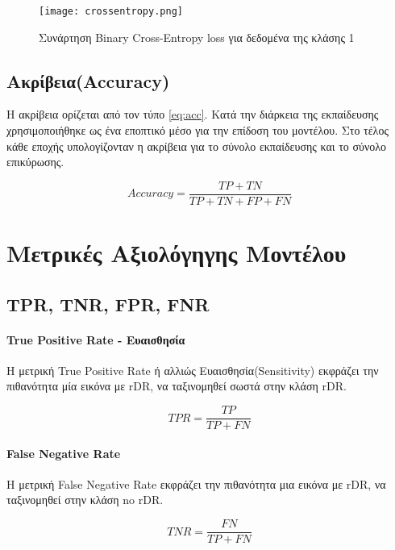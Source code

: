 \begin{figure}[!h]
    \centering
      \texttt{[image: crossentropy.png]} \caption{Συνάρτηση Binary Cross-Entropy loss για δεδομένα της κλάσης 1}
\label{figure:cross}    
\end{figure}
  
  
\subsection{Ακρίβεια(Accuracy)}
\label{subsec:6.1.2}
Η ακρίβεια ορίζεται από τον τύπο \ref{eq:acc}. Κατά την διάρκεια της εκπαίδευσης χρησιμοποιήθηκε ως ένα εποπτικό μέσο για την επίδοση του μοντέλου. Στο τέλος κάθε εποχής υπολογίζονταν η ακρίβεια για το σύνολο εκπαίδευσης και το σύνολο επικύρωσης.

\begin{equation} \label{eq:acc}
Accuracy = \frac{TP+TN}{TP+TN+FP+FN}
\end{equation}



\section{Μετρικές Αξιολόγηγης Μοντέλου}
\label{sec:6.2}



\subsection{TPR, TNR, FPR, FNR}
\label{subsec:6.2.1}

\paragraph{True Positive Rate - Ευαισθησία}
Η μετρική  True Positive Rate ή αλλιώς Ευαισθησία(Sensitivity) εκφράζει την πιθανότητα μία εικόνα με rDR, να ταξινομηθεί σωστά στην κλάση rDR.

\begin{equation} \label{eq:6.9}
TPR = \frac{TP}{TP + FN}
\end{equation}

\paragraph{False Negative Rate}
Η μετρική  False Negative Rate εκφράζει την πιθανότητα μια εικόνα με rDR, να ταξινομηθεί στην κλάση no rDR. 

\begin{equation} \label{eq:6.12}
TNR = \frac{FN}{TP + FN}
\end{equation}

